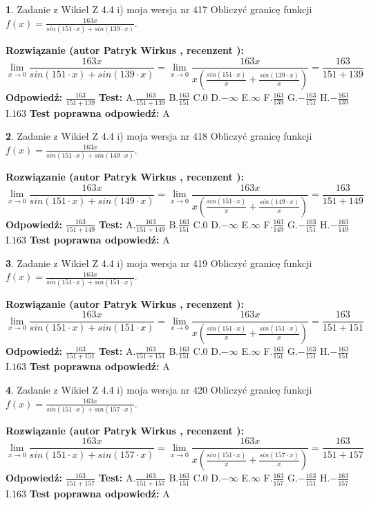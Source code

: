 \documentclass[12pt, a4paper]{article}
\theoremstyle{definition} %
\newtheorem{zad}{}
\newcommand{\zadStart}[1]{\begin{zad}#1\newline}
\newcommand{\zadStop}{\end{zad}}
\newcommand{\rozwStart}[2]{\noindent \textbf{Rozwiązanie (autor #1 , recenzent #2): }\newline}
\newcommand{\rozwStop}{\newline}
\newcommand{\odpStart}{\noindent \textbf{Odpowiedź:}\newline}
\newcommand{\odpStop}{\newline}
\newcommand{\testStart}{\noindent \textbf{Test:}\newline}
\newcommand{\testStop}{\newline}
\newcommand{\kluczStart}{\noindent \textbf{Test poprawna odpowiedź:}\newline}
\newcommand{\kluczStop}{\newline}
\begin{document}
\zadStart{Zadanie z Wikieł Z 4.4 i) moja wersja nr 417}
Obliczyć granicę funkcji $f(x)=\frac{163x}{sin(151\cdot x) +sin(139\cdot x)}$.
\zadStop
\rozwStart{Patryk Wirkus}{}
$$\lim\limits_{x\to 0}\frac{163x}{sin(151\cdot x) +sin(139\cdot x)}=\lim\limits_{x\to 0}\frac{163x}{x(\frac{sin(151\cdot x)}{x}+\frac{sin(139\cdot x)}{x})}=\frac{163}{151+139}$$
\rozwStop
\odpStart
$\frac{163}{151+139}$
\odpStop
\testStart
A.$\frac{163}{151+139}$
B.$\frac{163}{151}$
C.$0$
D.$-\infty$
E.$\infty$
F.$\frac{163}{139}$
G.$-\frac{163}{151}$
H.$-\frac{163}{139}$
I.$163$
\testStop
\kluczStart
A
\kluczStop



\zadStart{Zadanie z Wikieł Z 4.4 i) moja wersja nr 418}
Obliczyć granicę funkcji $f(x)=\frac{163x}{sin(151\cdot x) +sin(149\cdot x)}$.
\zadStop
\rozwStart{Patryk Wirkus}{}
$$\lim\limits_{x\to 0}\frac{163x}{sin(151\cdot x) +sin(149\cdot x)}=\lim\limits_{x\to 0}\frac{163x}{x(\frac{sin(151\cdot x)}{x}+\frac{sin(149\cdot x)}{x})}=\frac{163}{151+149}$$
\rozwStop
\odpStart
$\frac{163}{151+149}$
\odpStop
\testStart
A.$\frac{163}{151+149}$
B.$\frac{163}{151}$
C.$0$
D.$-\infty$
E.$\infty$
F.$\frac{163}{149}$
G.$-\frac{163}{151}$
H.$-\frac{163}{149}$
I.$163$
\testStop
\kluczStart
A
\kluczStop



\zadStart{Zadanie z Wikieł Z 4.4 i) moja wersja nr 419}
Obliczyć granicę funkcji $f(x)=\frac{163x}{sin(151\cdot x) +sin(151\cdot x)}$.
\zadStop
\rozwStart{Patryk Wirkus}{}
$$\lim\limits_{x\to 0}\frac{163x}{sin(151\cdot x) +sin(151\cdot x)}=\lim\limits_{x\to 0}\frac{163x}{x(\frac{sin(151\cdot x)}{x}+\frac{sin(151\cdot x)}{x})}=\frac{163}{151+151}$$
\rozwStop
\odpStart
$\frac{163}{151+151}$
\odpStop
\testStart
A.$\frac{163}{151+151}$
B.$\frac{163}{151}$
C.$0$
D.$-\infty$
E.$\infty$
F.$\frac{163}{151}$
G.$-\frac{163}{151}$
H.$-\frac{163}{151}$
I.$163$
\testStop
\kluczStart
A
\kluczStop



\zadStart{Zadanie z Wikieł Z 4.4 i) moja wersja nr 420}
Obliczyć granicę funkcji $f(x)=\frac{163x}{sin(151\cdot x) +sin(157\cdot x)}$.
\zadStop
\rozwStart{Patryk Wirkus}{}
$$\lim\limits_{x\to 0}\frac{163x}{sin(151\cdot x) +sin(157\cdot x)}=\lim\limits_{x\to 0}\frac{163x}{x(\frac{sin(151\cdot x)}{x}+\frac{sin(157\cdot x)}{x})}=\frac{163}{151+157}$$
\rozwStop
\odpStart
$\frac{163}{151+157}$
\odpStop
\testStart
A.$\frac{163}{151+157}$
B.$\frac{163}{151}$
C.$0$
D.$-\infty$
E.$\infty$
F.$\frac{163}{157}$
G.$-\frac{163}{151}$
H.$-\frac{163}{157}$
I.$163$
\testStop
\kluczStart
A
\kluczStop
\end{document}
